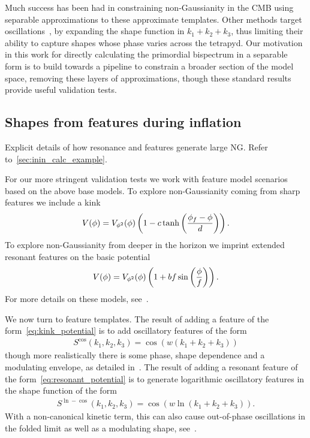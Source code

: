 Much success has been had in constraining non-Gaussianity
in the CMB using separable approximations to these approximate templates.
Other methods target oscillations~\cite{reso_estimator, excited_estimator},
by expanding the shape function
in $k_1+k_2+k_3$, thus limiting their ability to capture shapes whose
phase varies across the tetrapyd.
Our motivation in this work for directly calculating the primordial
bispectrum in a separable form is to build towards
a pipeline to constrain a broader section of the model space,
removing these layers of approximations,
though these standard results provide useful validation tests.
    \subsection{Shapes from features during inflation}
    Explicit details of how resonance and features generate large NG.
    Refer to~\ref{sec:inin_calc_example}.


For our more stringent validation tests we work with feature model scenarios
based on the above base models.
To explore non-Gaussianity coming from sharp features we include
a kink~\cite{Adams_step}
\begin{align}\label{eq:kink_potential}
    V(\phi) = V_{\phi^2}(\phi)\left(1-c\tanh\left(\frac{\phi_f-\phi}{d}\right)\right).
\end{align}
To explore non-Gaussianity from deeper in the horizon we imprint
extended resonant features on the basic potential
\begin{align}\label{eq:resonant_potential}
    V(\phi) = V_{\phi^2}(\phi)\left(1+bf\sin\left(\frac{\phi}{f}\right)\right).
\end{align}
For more details on these models, see~\cite{chen_easther_lim_2}.


We now turn to feature templates.
The result of adding a feature of the form~\eqref{eq:kink_potential}
is to add oscillatory features of the form
\begin{align}\label{cos_shape}
    S^{\cos}(k_1,k_2,k_3) = \cos(w(k_1+k_2+k_3))
\end{align}
though more realistically there is some phase, shape dependence and a modulating envelope,
as detailed in~\cite{adshead}.
The result of adding a resonant feature of the form~\eqref{eq:resonant_potential}
is to generate logarithmic oscillatory features in the shape function of the form
\begin{align}\label{ln_cos_shape}
    S^{\ln-\cos}(k_1,k_2,k_3) = \cos(w\ln(k_1+k_2+k_3)).
\end{align}
With a non-canonical kinetic term, this can also
cause out-of-phase oscillations in the folded limit as well as a modulating shape,
see~\cite{chen_folded_resonant}.


